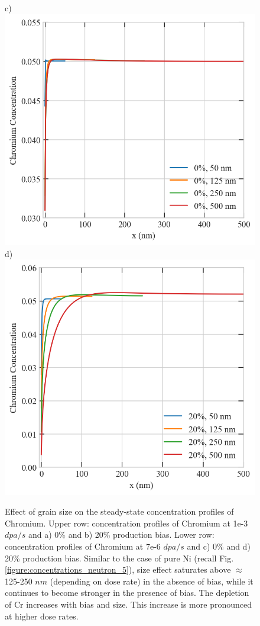 \documentclass[utf8]{frontiersSCNS} %
\begin{document}
\begin{figure}[h!]
        c)\includegraphics[scale=0.55]{srrt/plots/Fig14_c.png}
        d)\includegraphics[scale=0.55]{srrt/plots/Fig14_d.png}
        \caption{Effect of grain size on the steady-state concentration profiles of Chromium. Upper row: concentration profiles of Chromium at 1e-3 $dpa/s$  and a) 0\% and b) 20\% production bias. Lower row: concentration profiles of Chromium at 7e-6 $dpa/s$  and c) 0\% and d) 20\% production bias. Similar to the case of pure Ni (recall Fig. \ref{figure:concentrations_neutron_5}), size effect saturates above $\approx$125-250 $nm$ (depending on dose rate) in the absence of bias, while it continues to become stronger in the presence of bias. The depletion of Cr increases with bias and size. This increase is more pronounced at higher dose rates.}
        \label{figure:RIS_Cr_50_125_250_500nm_773K}
    \end{figure}
   
\end{document}
